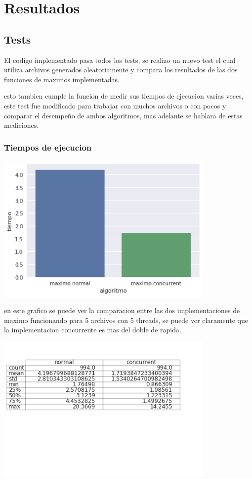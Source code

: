\section{Resultados}


\subsection{Tests} %

  El codigo implementado pasa todos los tests, se realizo un nuevo test el cual utiliza
  archivos generados aleatoriamente y compara los resultados de las dos funciones
  de maximos implementadas.

  esto tambien cumple la funcion de medir sus tiempos de ejecucion varias veces,
  este test fue modificado para trabajar con muchos archivos o con pocos y comparar
  el desempeño de ambos algoritmos, mas adelante
  se hablara de estas mediciones.

\subsubsection{Tiempos de ejecucion} %

\begin{center}
\includegraphics[width=0.8\textwidth]{imagenes/maxvsmax.png}
\end{center}

en este grafico se puede ver la comparacion entre las dos implementaciones de maximo funcionando
para 5 archivos con 5 threads, se puede ver claramente que la implementacion concurrente
es mas del doble de rapida.

\begin{center}
\includegraphics[width=0.8\textwidth]{imagenes/descplot.png}
\end{center}

